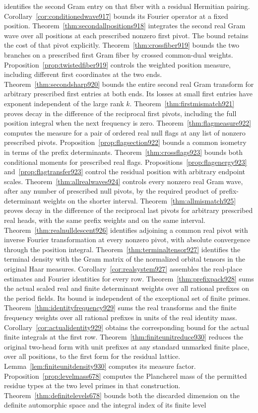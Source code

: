 \documentclass[a4paper,11pt]{article}
\theoremstyle{definition}
\theoremstyle{remark}
\numberwithin{equation}{section}
\begin{document}
identifies the second Gram entry on that fiber with a residual Hermitian pairing. Corollary~\ref{cor:conditionedwave917} bounds its Fourier operator at a fixed position. Theorem~\ref{thm:secondallpositions918} integrates the second real Gram wave over all positions at each prescribed nonzero first pivot. The bound retains the cost of that pivot explicitly. Theorem~\ref{thm:crossfiber919} bounds the two branches on a prescribed first Gram fiber by crossed common-dual weights. Proposition~\ref{prop:twistedfiber919} controls the weighted position measure, including different first coordinates at the two ends. Theorem~\ref{thm:secondsharp920} bounds the entire second real Gram transform for arbitrary prescribed first entries at both ends. Its losses at small first entries have exponent independent of the large rank \(k\). Theorem~\ref{thm:firstmismatch921} proves decay in the difference of the reciprocal first pivots, including the full position integral when the next frequency is zero. Theorem~\ref{thm:flagmeasure922} computes the measure for a pair of ordered real null flags at any list of nonzero prescribed pivots. Proposition~\ref{prop:flagsection922} bounds a common isometry in terms of the prefix determinants. Theorem~\ref{thm:crossflags923} bounds both conditional moments for prescribed real flags. Propositions~\ref{prop:flagenergy923} and~\ref{prop:flagtransfer923} control the residual position with arbitrary endpoint scales. Theorem~\ref{thm:allrealwaves924} controls every nonzero real Gram wave, after any number of prescribed null pivots, by the required product of prefix-determinant weights on the shorter interval. Theorem~\ref{thm:allmismatch925} proves decay in the difference of the reciprocal last pivots for arbitrary prescribed real heads, with the same prefix weights and on the same interval. Theorem~\ref{thm:realnulldescent926} identifies adjoining a common real pivot with inverse Fourier transformation at every nonzero pivot, with absolute convergence through the position integral. Theorem~\ref{thm:terminaltensor927} identifies the terminal density with the Gram matrix of the normalized orbital tensors in the original Haar measures. Corollary~\ref{cor:realsystem927} assembles the real-place estimates and Fourier identities for every row. Theorem~\ref{thm:prefixpack928} sums the actual scaled real and finite determinant weights over all rational prefixes on the period fields. Its bound is independent of the exceptional set of finite primes. Theorem~\ref{thm:identityfrequency929} sums the real transforms and the finite frequency weights over all rational prefixes in units of the real identity mass. Corollary~\ref{cor:actualidentity929} obtains the corresponding bound for the actual finite integrals at the first row. Theorem~\ref{thm:finiteunitreduce930} reduces the original two-head form with unit prefixes at any standard unmarked finite place, over all positions, to the first form for the residual lattice. Lemma~\ref{lem:finiteunitdensity930} computes its measure factor. Proposition~\ref{prop:levelmass678} computes the Plancherel mass of the permitted residue types at the two level primes in that construction. Theorem~\ref{thm:definitelevels678} bounds both the discarded dimension on the definite automorphic space and the integral index of its finite level 
\end{document}
